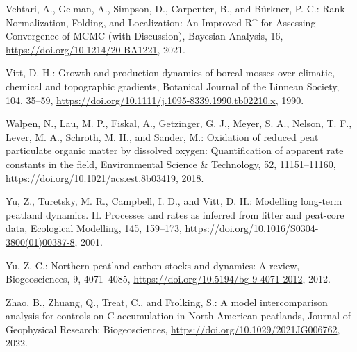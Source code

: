 \documentclass[
  12pt,
]{article}
\newlength{\cslhangindent}
\newlength{\cslentryspacingunit} %
\newenvironment{CSLReferences}[2] %
 {%
  \setlength{\parindent}{0pt}
  \ifodd #1
  \let\oldpar\par
  \def\par{\hangindent=\cslhangindent\oldpar}
  \fi
  \setlength{\parskip}{#2\cslentryspacingunit}
 }%
 {}
\begin{document}
\begin{CSLReferences}{0}{0}
\leavevmode{}%
Vehtari, A., Gelman, A., Simpson, D., Carpenter, B., and Bürkner, P.-C.: Rank-{Normalization}, {Folding}, and {Localization}: {An Improved R{\^{}}} for {Assessing Convergence} of {MCMC} (with {Discussion}), Bayesian Analysis, 16, \url{https://doi.org/10.1214/20-BA1221}, 2021.

\leavevmode{}%
Vitt, D. H.: Growth and production dynamics of boreal mosses over climatic, chemical and topographic gradients, Botanical Journal of the Linnean Society, 104, 35--59, \url{https://doi.org/10.1111/j.1095-8339.1990.tb02210.x}, 1990.

\leavevmode{}%
Walpen, N., Lau, M. P., Fiskal, A., Getzinger, G. J., Meyer, S. A., Nelson, T. F., Lever, M. A., Schroth, M. H., and Sander, M.: Oxidation of reduced peat particulate organic matter by dissolved oxygen: {Quantification} of apparent rate constants in the field, Environmental Science \& Technology, 52, 11151--11160, \url{https://doi.org/10.1021/acs.est.8b03419}, 2018.

\leavevmode{}%
Yu, Z., Turetsky, M. R., Campbell, I. D., and Vitt, D. H.: Modelling long-term peatland dynamics. {II}. {Processes} and rates as inferred from litter and peat-core data, Ecological Modelling, 145, 159--173, \url{https://doi.org/10.1016/S0304-3800(01)00387-8}, 2001.

\leavevmode{}%
Yu, Z. C.: Northern peatland carbon stocks and dynamics: A review, Biogeosciences, 9, 4071--4085, \url{https://doi.org/10.5194/bg-9-4071-2012}, 2012.

\leavevmode{}%
Zhao, B., Zhuang, Q., Treat, C., and Frolking, S.: A model intercomparison analysis for controls on {C} accumulation in {North American} peatlands, Journal of Geophysical Research: Biogeosciences, \url{https://doi.org/10.1029/2021JG006762}, 2022.

\end{CSLReferences}
\end{document}
